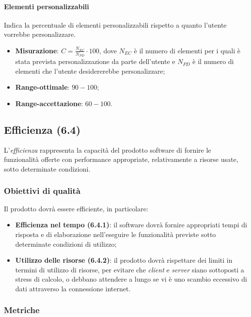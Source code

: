 \paragraph{Elementi personalizzabili}
Indica la percentuale di elementi personalizzabili rispetto a quanto l'utente vorrebbe personalizzare.
\begin{itemize}
\item \textbf{Misurazione}: $C=\frac{N_{EC}}{N_{PD}} \cdot 100$, dove $N_{EC}$ è il numero di elementi per i quali è stata prevista personalizzazione da parte dell'utente e $N_{PD}$ è il numero di elementi che l'utente desidererebbe personalizzare;
\item \textbf{Range-ottimale}: $90 - 100$;
\item \textbf{Range-accettazione}: $60 - 100$.
\end{itemize}

\subsection{Efficienza (6.4)}
\label{efficienza}
L'\textit{efficienza} rappresenta la capacità del prodotto software di fornire le funzionalità offerte con performance appropriate, relativamente a risorse usate, sotto determinate condizioni.
\subsubsection{Obiettivi di qualità}
Il prodotto dovrà essere efficiente, in particolare:
\begin{itemize}
\item \textbf{Efficienza nel tempo (6.4.1)}: il software dovrà fornire appropriati tempi di risposta e  di elaborazione nell'eseguire le funzionalità previste sotto determinate condizioni di utilizzo;
\item \textbf{Utilizzo delle risorse (6.4.2)}: il prodotto dovrà rispettare dei limiti in termini di utilizzo di risorse, per evitare che \textit{client} e \textit{server} siano sottoposti a stress di calcolo, o debbano attendere a lungo se vi è uno scambio eccessivo di dati attraverso la connessione internet.
\end{itemize}
\subsubsection{Metriche}

